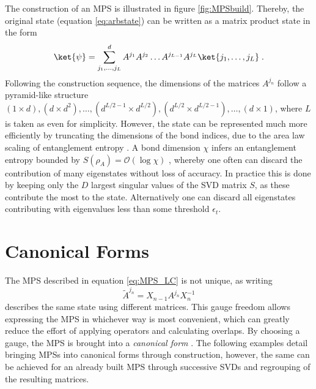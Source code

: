 The construction of an MPS is illustrated in figure \ref{fig:MPSbuild}. Thereby, the original state (equation \ref{eq:arbstate}) can be written as a matrix product state in the form \cite{schollwock}
\begin{equation}
	\ket{\psi} = \sum_{j_1, \ldots, j_L}^{d} A^{j_1} A^{j_2} \ldots A^{j_{L-1}} A^{j_{L}} \ket{j_1, \ldots, j_L} \; .
	\label{eq:MPS_LC} 
\end{equation}
Following the construction sequence, the dimensions of the matrices $A^{j_n}$ follow a pyramid-like structure $(1 \times d ),(d \times d^2) , \ldots , (d^{L/2 -1} \times d^{L/2}) , (d^{L/2} \times d^{L/2 -1 }), \ldots , (d \times 1)$, where $L$ is taken as even for simplicity. 
However, the state can be represented much more efficiently by truncating the dimensions of the bond indices, due to the area law scaling of entanglement entropy \cite{EntropyScaling}. A bond dimension $\chi$ infers an entanglement entropy bounded by $S(\rho_A) = \mathcal{O}(\log \chi)$ \cite{Gillman2018}, whereby one often can discard the contribution of many eigenstates without loss of accuracy. In practice this is done by keeping only the $D$ largest singular values of the SVD matrix $S$, as these contribute the most to the state. Alternatively  one can discard all eigenstates contributing with eigenvalues less than some threshold $\epsilon_t$.


\section{Canonical Forms}
\label{sec:canonical}
The MPS described in equation \ref{eq:MPS_LC} is not unique, as writing 
\begin{equation}
	\tilde{A}^{j_n} = X_{n-1} A^{j_n} X_{n}^{-1}
\end{equation}
describes the same state using different matrices. This gauge freedom allows expressing the MPS in whichever way is most convenient, which can greatly reduce the effort of applying operators and calculating overlaps. By choosing a gauge, the MPS is brought into a \textit{canonical form} \cite{Vidal2007}. The following examples detail bringing MPSs into canonical forms through construction, however, the same can be achieved for an already built MPS through successive SVDs and regrouping of the resulting matrices. 

